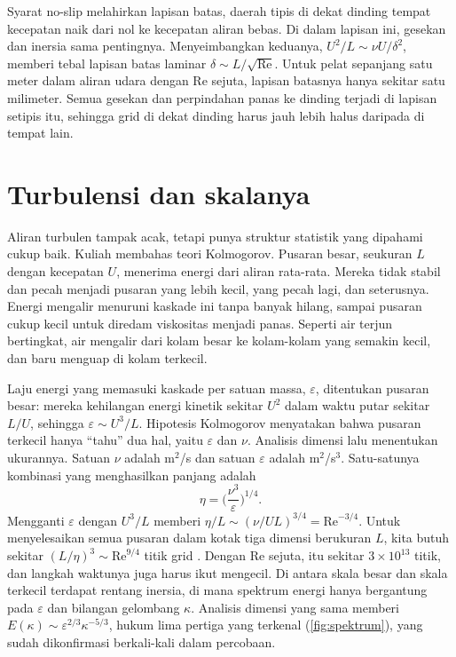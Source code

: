 Syarat no-slip melahirkan lapisan batas, daerah tipis di dekat dinding tempat kecepatan naik dari nol ke
kecepatan aliran bebas. Di dalam lapisan ini, gesekan dan inersia sama pentingnya. Menyeimbangkan
keduanya, $U^2/L\sim\nu U/\delta^2$, memberi tebal lapisan batas laminar $\delta\sim L/\sqrt{\mathrm{Re}}$.
Untuk pelat sepanjang satu meter dalam aliran udara dengan Re sejuta, lapisan batasnya hanya sekitar satu
milimeter. Semua gesekan dan perpindahan panas ke dinding terjadi di lapisan setipis itu, sehingga grid di
dekat dinding harus jauh lebih halus daripada di tempat lain.

\section{Turbulensi dan skalanya}

Aliran turbulen tampak acak, tetapi punya struktur statistik yang dipahami cukup baik. Kuliah membahas teori
Kolmogorov. Pusaran besar, seukuran $L$ dengan kecepatan $U$, menerima energi dari aliran rata-rata. Mereka tidak
stabil dan pecah menjadi pusaran yang lebih kecil, yang pecah lagi, dan seterusnya. Energi mengalir menuruni
kaskade ini tanpa banyak hilang, sampai pusaran cukup kecil untuk diredam viskositas menjadi panas. Seperti air
terjun bertingkat, air mengalir dari kolam besar ke kolam-kolam yang semakin kecil, dan baru menguap di kolam
terkecil.

Laju energi yang memasuki kaskade per satuan massa, $\varepsilon$, ditentukan pusaran besar: mereka kehilangan
energi kinetik sekitar $U^2$ dalam waktu putar sekitar $L/U$, sehingga $\varepsilon\sim U^3/L$. Hipotesis
Kolmogorov menyatakan bahwa pusaran terkecil hanya ``tahu'' dua hal, yaitu $\varepsilon$ dan $\nu$. Analisis
dimensi lalu menentukan ukurannya. Satuan $\nu$ adalah m$^2$/s dan satuan $\varepsilon$ adalah m$^2$/s$^3$. Satu-satunya
kombinasi yang menghasilkan panjang adalah
\begin{equation}
\eta=\Big(\frac{\nu^3}{\varepsilon}\Big)^{1/4}.
\end{equation}
Mengganti $\varepsilon$ dengan $U^3/L$ memberi $\eta/L\sim(\nu/UL)^{3/4}=\mathrm{Re}^{-3/4}$. Untuk menyelesaikan
semua pusaran dalam kotak tiga dimensi berukuran $L$, kita butuh sekitar $(L/\eta)^3\sim\mathrm{Re}^{9/4}$ titik grid
\citep{pope2000}. Dengan Re sejuta, itu sekitar $3\times10^{13}$ titik, dan langkah waktunya juga harus ikut
mengecil. Di antara skala besar dan skala terkecil terdapat rentang inersia, di mana spektrum energi hanya
bergantung pada $\varepsilon$ dan bilangan gelombang $\kappa$. Analisis dimensi yang sama memberi
$E(\kappa)\sim\varepsilon^{2/3}\kappa^{-5/3}$, hukum lima pertiga yang terkenal (\cref{fig:spektrum}), yang sudah
dikonfirmasi berkali-kali dalam percobaan.

